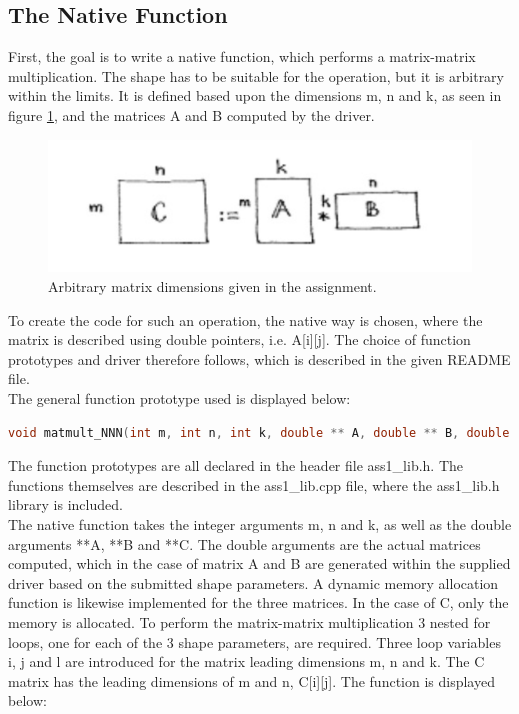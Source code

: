 \subsection{The Native Function}

First, the goal is to write a native function, which performs a matrix-matrix multiplication. The shape has to be suitable for the operation, but it is arbitrary within the limits. It is defined based upon the dimensions m, n and k, as seen in figure \ref{fig:matrix1}, and the matrices A and B computed by the driver.

\begin{figure}[h!] 
	\begin{center}
		\includegraphics[width=0.7 \textwidth]{fig/matrix1.PNG} 
		\caption{Arbitrary matrix dimensions given in the assignment.}
		\label{fig:matrix1}
	\end{center}
\end{figure}


To create the code for such an operation, the native way is chosen, where the matrix is described using double pointers, i.e. A[i][j]. The choice of function prototypes and driver therefore follows, which is described in the given README file.  \\
The general function prototype used is displayed below:
\begin{lstlisting}[language=C++, caption=Function Prototype]
void matmult_NNN(int m, int n, int k, double ** A, double ** B, double ** C)
\end{lstlisting}

The function prototypes are all declared in the header file ass1\_lib.h. The functions themselves are described in the ass1\_lib.cpp file, where the ass1\_lib.h library is included. \\

The native function takes the integer arguments m, n and k, as well as the double arguments **A, **B and **C. The double arguments are the actual matrices computed, which in the case of matrix A and B are generated within the supplied driver based on the submitted shape parameters. A dynamic memory allocation function is likewise implemented for the three matrices. In the case of C, only the memory is allocated. To perform the matrix-matrix multiplication 3 nested for loops, one for each of the 3 shape parameters, are required. Three loop variables i, j and l are introduced for the matrix leading dimensions m, n and k. The C matrix has the leading dimensions of m and n, C[i][j]. The function is displayed below:

